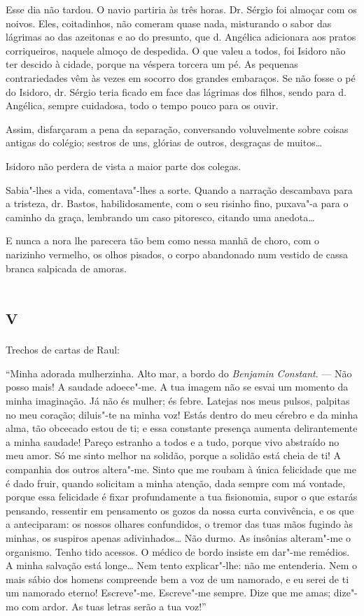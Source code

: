 Esse dia não tardou. O navio partiria às três horas. Dr. Sérgio foi
almoçar com os noivos. Eles, coitadinhos, não comeram quase nada,
misturando o sabor das lágrimas ao das azeitonas e ao do presunto, que
d. Angélica adicionara aos pratos corriqueiros, naquele almoço de
despedida. O que valeu a todos, foi Isidoro não ter descido à cidade,
porque na véspera torcera um pé. As pequenas contrariedades vêm às vezes
em socorro dos grandes embaraços. Se não fosse o pé do Isidoro, dr.
Sérgio teria ficado em face das lágrimas dos filhos, sendo para d.
Angélica, sempre cuidadosa, todo o tempo pouco para os ouvir.

Assim, disfarçaram a pena da separação, conversando voluvelmente sobre
coisas antigas do colégio; sestros de uns, glórias de outros, desgraças
de muitos\ldots{}

Isidoro não perdera de vista a maior parte dos colegas.

Sabia"-lhes a vida, comentava"-lhes a sorte. Quando a narração descambava
para a tristeza, dr. Bastos, habilidosamente, com o seu risinho fino,
puxava"-a para o caminho da graça, lembrando um caso pitoresco, citando
uma anedota\ldots{}

E nunca a nora lhe parecera tão bem como nessa manhã de choro, com o
narizinho vermelho, os olhos pisados, o corpo abandonado num vestido de
cassa branca salpicada de amoras.

\section*{\textsc{v}}

Trechos de cartas de Raul:

``Minha adorada mulherzinha. Alto mar, a bordo do \emph{Benjamin
Constant}. --- Não posso mais! A saudade adoece"-me. A tua imagem não se
esvai um momento da minha imaginação. Já não és mulher; és febre.
Latejas nos meus pulsos, palpitas no meu coração; diluis"-te na minha
voz! Estás dentro do meu cérebro e da minha alma, tão obcecado estou de
ti; e essa constante presença aumenta delirantemente a minha saudade!
Pareço estranho a todos e a tudo, porque vivo abstraído no meu amor. Só
me sinto melhor na solidão, porque a solidão está cheia de ti! A
companhia dos outros altera"-me. Sinto que me roubam à única felicidade
que me é dado fruir, quando solicitam a minha atenção, dada sempre com
má vontade, porque essa felicidade é fixar profundamente a tua
fisionomia, supor o que estarás pensando, ressentir em pensamento os
gozos da nossa curta convivência, e os que a anteciparam: os nossos
olhares confundidos, o tremor das tuas mãos fugindo às minhas, os
suspiros apenas adivinhados\ldots{} Não durmo. As insônias alteram"-me o
organismo. Tenho tido acessos. O médico de bordo insiste em dar"-me
remédios. A minha salvação está longe\ldots{} Nem tento explicar"-lhe: não me
entenderia. Nem o mais sábio dos homens compreende bem a voz de um
namorado, e eu serei de ti um namorado eterno! Escreve"-me. Escreve"-me
sempre. Dize que me amas; dize"-mo com ardor. As tuas letras serão a tua
voz!''

